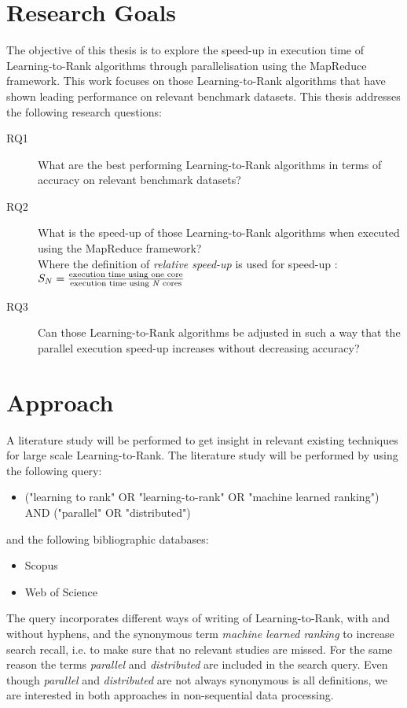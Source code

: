 \chapter{Research Goals}
\label{chap:goals}
The objective of this thesis is to explore the speed-up in execution time of Learning-to-Rank algorithms through parallelisation using the MapReduce framework.
This work focuses on those Learning-to-Rank algorithms that have shown leading performance on relevant benchmark datasets.
This thesis addresses the following research questions:
\begin{description}
\item[RQ1] What are the best performing Learning-to-Rank algorithms in terms of accuracy on relevant benchmark datasets?\\

\item[RQ2] What is the speed-up of those Learning-to-Rank algorithms when executed using the MapReduce framework?\\
Where the definition of \emph{relative speed-up} is used for speed-up \cite{Sun1991}:\\

$S_N = \frac{\text{execution time using one core}}{\text{execution time using \emph{N} cores}}$

\item[RQ3] Can those Learning-to-Rank algorithms be adjusted in such a way that the parallel execution speed-up increases without decreasing accuracy?
\end{description}

\chapter{Approach}
A literature study will be performed to get insight in relevant existing techniques for large scale Learning-to-Rank. The literature study will be performed by using the following query:
\begin{itemize}
\item ("learning to rank" OR "learning-to-rank" OR "machine learned ranking") AND ("parallel" OR "distributed")
\end{itemize}
and the following bibliographic databases:
\begin{itemize}
\item Scopus
\item Web of Science
\end{itemize}

The query incorporates different ways of writing of Learning-to-Rank, with and without hyphens, and the synonymous term \emph{machine learned ranking} to increase search recall, i.e. to make sure that no relevant studies are missed. For the same reason the terms \emph{parallel} and \emph{distributed} are included in the search query. Even though \emph{parallel} and \emph{distributed} are not always synonymous is all definitions, we are interested in both approaches in non-sequential data processing.\\

